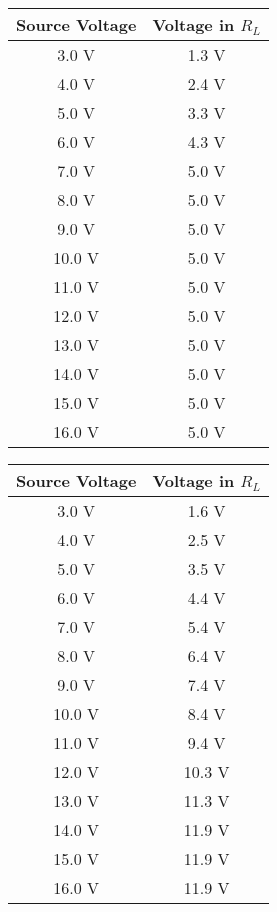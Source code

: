 \begin{multicols}{2}
\begin{tasks}
\begin{center}
\begin{tabular}[.5cm]{ c c }
\toprule
Source Voltage & Voltage in $R_{L}$ \\
\midrule
3.0 V & 1.3 V \\
\cmidrule{1-2}
4.0 V & 2.4 V \\
\cmidrule{1-2}
5.0 V & 3.3 V \\
\cmidrule{1-2}
6.0 V & 4.3 V \\
\cmidrule{1-2}
7.0 V & 5.0 V \\
\cmidrule{1-2}
8.0 V & 5.0 V \\
\cmidrule{1-2}
9.0 V & 5.0 V \\
\cmidrule{1-2}
10.0 V & 5.0 V \\
\cmidrule{1-2}
11.0 V & 5.0 V \\
\cmidrule{1-2}
12.0 V & 5.0 V \\
\cmidrule{1-2}
13.0 V & 5.0 V \\
\cmidrule{1-2}
14.0 V & 5.0 V \\
\cmidrule{1-2}
15.0 V & 5.0 V \\
\cmidrule{1-2}
16.0 V & 5.0 V \\
\bottomrule
\end{tabular}
\end{center} 

\begin{center}
\begin{tabular}[.5cm]{ c c }
\toprule
Source Voltage & Voltage in $R_{L}$ \\
\midrule
3.0 V & 1.6 V \\
\cmidrule{1-2}
4.0 V & 2.5 V \\
\cmidrule{1-2}
5.0 V & 3.5 V \\
\cmidrule{1-2}
6.0 V & 4.4 V \\
\cmidrule{1-2}
7.0 V & 5.4 V \\
\cmidrule{1-2}
8.0 V & 6.4 V \\
\cmidrule{1-2}
9.0 V & 7.4 V \\
\cmidrule{1-2}
10.0 V & 8.4 V \\
\cmidrule{1-2}
11.0 V & 9.4 V \\
\cmidrule{1-2}
12.0 V & 10.3 V \\
\cmidrule{1-2}
13.0 V & 11.3 V \\
\cmidrule{1-2}
14.0 V & 11.9 V \\
\cmidrule{1-2}
15.0 V & 11.9 V \\
\cmidrule{1-2}
16.0 V & 11.9 V \\
\bottomrule
\end{tabular}
\end{center} 
\end{tasks}
\end{multicols} 

\pagebreak